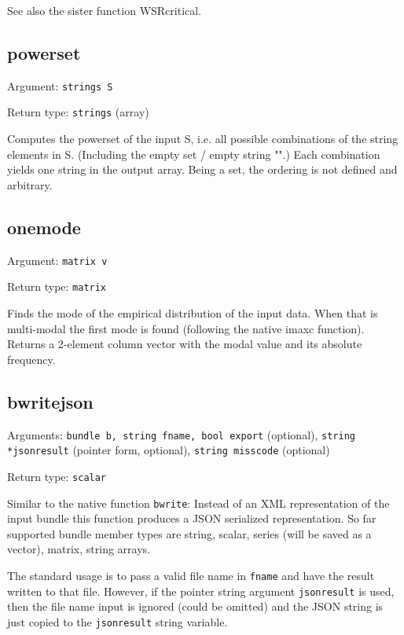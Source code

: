 \documentclass[11pt,english]{article}
\begin{document}
See also the sister function WSRcritical.

\subsection{powerset}

Argument: \texttt{strings S}

\noindent Return type: \texttt{strings} (array)

Computes the powerset of the input S, i.e. all possible combinations 
of the string elements in S. (Including the empty set / 
empty string "".) Each combination yields one string in the output 
array. Being a set, the ordering is not defined and arbitrary. 


\subsection{onemode}

Argument: \texttt{matrix v}

\noindent Return type: \texttt{matrix}

Finds the mode of the empirical distribution of the input data. 
When that is multi-modal the first mode is found (following the native
imaxc function). Returns a 2-element column vector with the modal 
value and its absolute frequency.

\subsection{bwritejson}

Arguments: \texttt{bundle b, string fname, bool export} (optional), 
    \texttt{string *jsonresult} (pointer form, optional), 
    \texttt{string misscode} (optional)

\noindent Return type: \texttt{scalar}

Similar to the native function \texttt{bwrite}: Instead of an XML representation 
of the input bundle this function produces a JSON serialized representation.
So far supported bundle member types are string, scalar, series (will be saved as a
vector), matrix, string arrays.

The standard usage is to pass a valid file name in \texttt{fname} and have the result 
written to that file. However, if the pointer string argument \texttt{jsonresult} is used, 
then the file name input is ignored (could be omitted) and the JSON string is just 
copied to the \texttt{jsonresult} string variable. 
\end{document}
